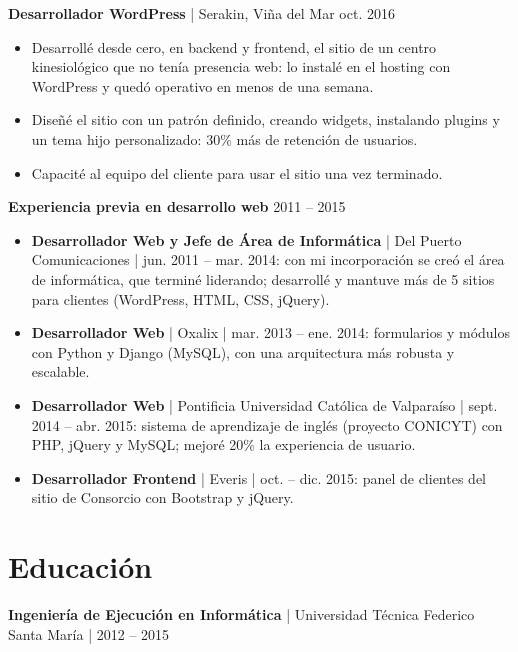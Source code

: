 \documentclass[10pt,letterpaper]{article}
\newcommand{\cvjob}[3]{%
  \vspace{5pt}%
  \textbf{#1} | #2 \hfill #3\par\vspace{1pt}}
\begin{document}
\cvjob{Desarrollador WordPress}{Serakin, Viña del Mar}{oct. 2016}
\begin{itemize}
  \item Desarrollé desde cero, en backend y frontend, el sitio de un centro kinesiológico que no tenía presencia web: lo instalé en el hosting con WordPress y quedó operativo en menos de una semana.
  \item Diseñé el sitio con un patrón definido, creando widgets, instalando plugins y un tema hijo personalizado: 30\% más de retención de usuarios.
  \item Capacité al equipo del cliente para usar el sitio una vez terminado.
\end{itemize}

\vspace{5pt}\textbf{Experiencia previa en desarrollo web} \hfill 2011 -- 2015\par\vspace{1pt}
\begin{itemize}
  \item \textbf{Desarrollador Web y Jefe de Área de Informática} | Del Puerto Comunicaciones | jun. 2011 -- mar. 2014: con mi incorporación se creó el área de informática, que terminé liderando; desarrollé y mantuve más de 5 sitios para clientes (WordPress, HTML, CSS, jQuery).
  \item \textbf{Desarrollador Web} | Oxalix | mar. 2013 -- ene. 2014: formularios y módulos con Python y Django (MySQL), con una arquitectura más robusta y escalable.
  \item \textbf{Desarrollador Web} | Pontificia Universidad Católica de Valparaíso | sept. 2014 -- abr. 2015: sistema de aprendizaje de inglés (proyecto CONICYT) con PHP, jQuery y MySQL; mejoré 20\% la experiencia de usuario.
  \item \textbf{Desarrollador Frontend} | Everis | oct. -- dic. 2015: panel de clientes del sitio de Consorcio con Bootstrap y jQuery.
\end{itemize}

\section{Educación}
\textbf{Ingeniería de Ejecución en Informática} | Universidad Técnica Federico Santa María | 2012 -- 2015

\end{document}
